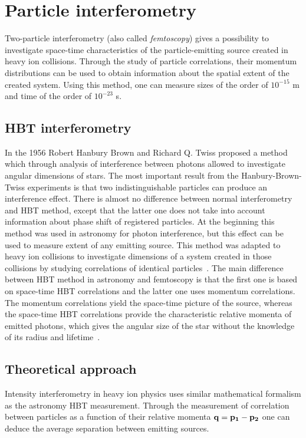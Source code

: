 \chapter{Particle interferometry}
  Two-particle interferometry (also called \textit{femtoscopy}) gives a possibility to investigate space-time characteristics of the particle-emitting source created in heavy ion collisions.
  Through the study of particle correlations, their momentum distributions can be used to obtain information about the spatial extent of the created system.
  Using this method, one can measure sizes of the order of $10^{-15}$ m and time of the order of $10^{-23}$ s.
  \section{HBT interferometry}
    In the 1956 Robert Hanbury Brown and Richard Q. Twiss proposed a method which through analysis of interference between photons allowed to investigate angular dimensions of stars.
    The most important result from the Hanbury-Brown-Twiss experiments is that two indistinguishable particles can produce an interference effect.
    There is almost no difference between normal interferometry and HBT method, except that the latter one does not take into account information about phase shift of registered particles.
    At the beginning this method was used in astronomy for photon interference, but this effect can be used to measure extent of any emitting source.
    This method was adapted to heavy ion collisions to investigate dimensions of a system created in those collisions by studying correlations of identical particles~\cite{nonidfemto}.
    The main difference between HBT method in astronomy and femtoscopy is that the first one is based on space-time HBT correlations and the latter one uses momentum correlations.
    The momentum correlations yield the space-time picture of the source, whereas the space-time HBT correlations provide the characteristic relative momenta of emitted photons, which gives the angular size of the star without the knowledge of its radius and lifetime~\cite{florkowski}.
  \section{Theoretical approach}
    Intensity interferometry in heavy ion physics uses similar mathematical formalism as the astronomy HBT measurement.
    Through the measurement of correlation between particles as a function of their relative momenta $\mathbf{q} = \mathbf{p_1} - \mathbf{p_2}$ one can deduce the average separation between emitting sources.
